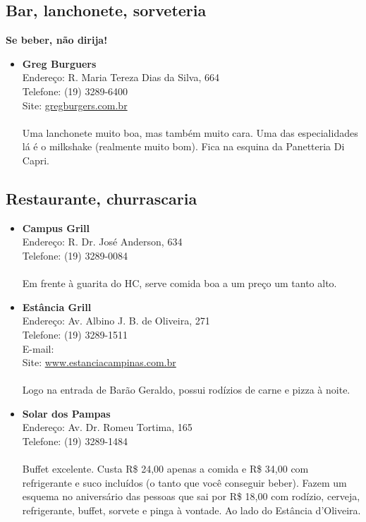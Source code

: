 \subsection{Bar, lanchonete, sorveteria}

\textbf{Se beber, não dirija!}

\begin{itemize}
\item \textbf{Greg Burguers}
  \\Endereço: R. Maria Tereza Dias da Silva, 664
  \\Telefone: (19) 3289-6400
  \\Site: \url{gregburgers.com.br}
  \\
  \\Uma lanchonete muito boa, mas também muito cara. Uma das especialidades lá
  é o milkshake (realmente muito bom). Fica na esquina da Panetteria Di Capri.
\end{itemize}

\subsection{Restaurante, churrascaria}

\begin{itemize}
\item \textbf{Campus Grill}
  \\Endereço: R. Dr. José Anderson, 634
  \\Telefone: (19) 3289-0084
  \\
  \\Em frente à guarita do HC, serve comida boa a um preço um tanto alto.

\item \textbf{Estância Grill}
  \\Endereço: Av. Albino J. B. de Oliveira, 271
  \\Telefone: (19) 3289-1511
  \\E-mail: 
  \\Site: \url{www.estanciacampinas.com.br}
  \\
  \\Logo na entrada de Barão Geraldo, possui rodízios de carne e pizza à noite.

\item \textbf{Solar dos Pampas}
  \\Endereço: Av. Dr. Romeu Tortima, 165
  \\Telefone: (19) 3289-1484
  \\
  \\Buffet excelente. Custa R\$ 24,00 apenas a comida e R\$ 34,00 com
  refrigerante e suco incluídos (o tanto que você conseguir beber). Fazem um
  esquema no aniversário das pessoas que sai por R\$ 18,00 com rodízio,
  cerveja, refrigerante, buffet, sorvete e pinga à vontade. Ao lado do Estância
  d'Oliveira.
\end{itemize}

